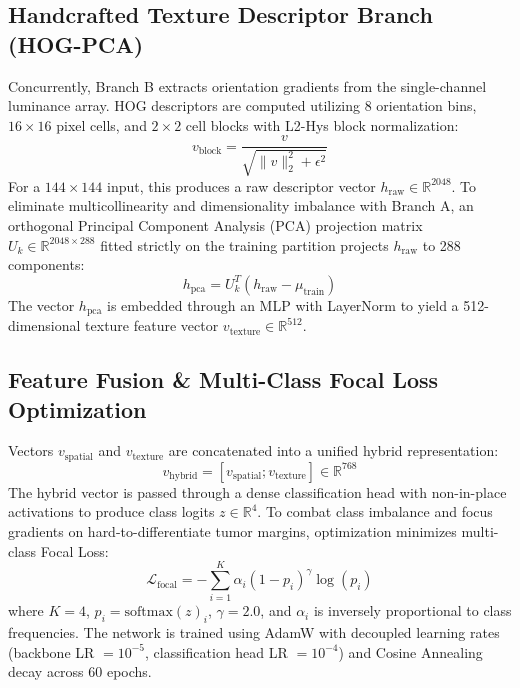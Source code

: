 \documentclass[journal,twocolumn,10pt]{IEEEtran}
\begin{document}
\subsection{Handcrafted Texture Descriptor Branch (HOG-PCA)}
Concurrently, Branch B extracts orientation gradients from the single-channel luminance array. HOG descriptors are computed utilizing 8 orientation bins, $16 \times 16$ pixel cells, and $2 \times 2$ cell blocks with L2-Hys block normalization:
\begin{equation}
    v_{\text{block}} = \frac{v}{\sqrt{\|v\|_2^2 + \epsilon^2}}
\end{equation}
For a $144 \times 144$ input, this produces a raw descriptor vector $h_{\text{raw}} \in \mathbb{R}^{2048}$. To eliminate multicollinearity and dimensionality imbalance with Branch A, an orthogonal Principal Component Analysis (PCA) projection matrix $U_k \in \mathbb{R}^{2048 \times 288}$ fitted strictly on the training partition projects $h_{\text{raw}}$ to 288 components:
\begin{equation}
    h_{\text{pca}} = U_k^T (h_{\text{raw}} - \mu_{\text{train}})
    \label{eq:pca}
\end{equation}
The vector $h_{\text{pca}}$ is embedded through an MLP with LayerNorm to yield a 512-dimensional texture feature vector $v_{\text{texture}} \in \mathbb{R}^{512}$.

\subsection{Feature Fusion \& Multi-Class Focal Loss Optimization}
Vectors $v_{\text{spatial}}$ and $v_{\text{texture}}$ are concatenated into a unified hybrid representation:
\begin{equation}
    v_{\text{hybrid}} = \left[v_{\text{spatial}}; v_{\text{texture}}\right] \in \mathbb{R}^{768}
\end{equation}
The hybrid vector is passed through a dense classification head with non-in-place activations to produce class logits $z \in \mathbb{R}^4$. To combat class imbalance and focus gradients on hard-to-differentiate tumor margins, optimization minimizes multi-class Focal Loss:
\begin{equation}
    \mathcal{L}_{\text{focal}} = -\sum_{i=1}^K \alpha_i (1 - p_i)^\gamma \log(p_i)
    \label{eq:focal}
\end{equation}
where $K = 4$, $p_i = \text{softmax}(z)_i$, $\gamma = 2.0$, and $\alpha_i$ is inversely proportional to class frequencies. The network is trained using AdamW with decoupled learning rates (backbone LR $= 10^{-5}$, classification head LR $= 10^{-4}$) and Cosine Annealing decay across 60 epochs.
\end{document}
